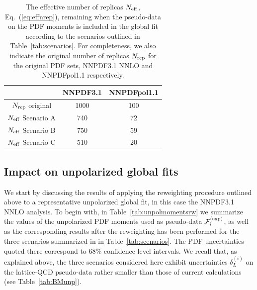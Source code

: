 \begin{table}[t]
  \centering
  \renewcommand{\arraystretch}{1.3} 
  \begin{tabular}{c|c|c}
    \hline
    &  NNPDF3.1  &  NNPDFpol1.1 \\
    \hline
    \hline
    $N_{\rm rep}$ original   &   1000 &  100   \\
    \hline
     $N_{\rm eff}$ Scenario A    &   740  &  72   \\
     $N_{\rm eff}$ Scenario B    &   750   &   59  \\
     $N_{\rm eff}$ Scenario C   &   510  &   20  \\
    \hline
  \end{tabular}
  \caption{\small The effective number of replicas
    $N_{\rm eff}$, Eq.~(\ref{eq:effnrep}), remaining when the pseudo-data
    on the PDF moments is included in the global
    fit according to the scenarios outlined
    in Table~\ref{tab:scenarios}.
    For completeness, we also indicate the original number
    of replicas $N_{\rm rep}$ for the original
    PDF sets, NNPDF3.1 NNLO and NNPDFpol1.1 respectively.
    \label{tab:neff}
  }
\end{table}

\subsection{Impact on unpolarized global fits}
%
We start by discussing the results of applying the reweighting procedure
outlined above to a representative unpolarized
global fit, in this case the NNPDF3.1 NNLO analysis.
%
To begin with, in Table~\ref{tab:unpolmomentsrw} we summarize
the values of the unpolarized PDF moments
used as pseudo-data $\mathcal{F}_i^{(\rm exp)}$,
as well as the corresponding results
  after the reweighting has been performed for the
three scenarios summarized in 
in Table~\ref{tab:scenarios}.
%
The PDF uncertainties quoted there correspond to 68\% confidence level intervals.
%
We recall that, as explained above, the three scenarios considered here exhibit
uncertainties $\delta_L^{(i)}$ on the lattice-QCD pseudo-data rather smaller
than those of current calculations (see Table~\ref{tab:BMunp}).

